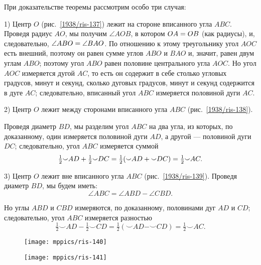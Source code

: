 При доказательстве теоремы рассмотрим особо три случая:

1) Центр $O$ (рис.~\ref{1938/ris-137}) лежит на стороне вписанного угла $ABC$.
Проведя радиус $AO$, мы получим $\angle AOB$, в котором $OA \z= OB$ (как радиусы), и, следовательно, $\angle ABO\z=\angle BAO$.
По отношению к этому треугольнику угол $AOC$ есть внешний, поэтому он равен сумме углов $ABO$ и $BAO$ и, значит, равен двум углам $ABO$;
поэтому угол $ABO$ равен половине центрального угла $AOC$.
Но угол $AOC$ измеряется дугой $AC$, то есть
он содержит в себе столько угловых градусов, минут и секунд, сколько дуговых градусов, минут и секунд содержится в дуге $AC$;
следовательно, вписанный угол $ABC$ измеряется половиной дуги $AC$.

2) Центр $O$ лежит между сторонами вписанного угла $ABC$ (рис.~\ref{1938/ris-138}).

Проведя диаметр $BD$, мы разделим угол $ABC$ на два угла, из которых, по доказанному, один измеряется половиной дуги $AD$, а другой — половиной дуги $DC$;
следовательно, угол $ABC$ измеряется суммой
\[\tfrac12{\smallsmile}AD\z+\tfrac12{\smallsmile}DC=\tfrac12({\smallsmile}AD\z+{\smallsmile}DC)=\tfrac12{\smallsmile}AC.\]


3) Центр $O$ лежит вне вписанного угла $ABC$ (рис.~\ref{1938/ris-139}).
Проведя диаметр $BD$, мы будем иметь:
\[\angle ABC=\angle ABD-\angle CBD.\]

Но углы $ABD$ и $CBD$ измеряются, по доказанному, половинами дуг $AD$ и $CD$;
следовательно, угол $ABC$ измеряется разностью
\[\tfrac12{\smallsmile}AD-\tfrac12{\smallsmile}CD=\tfrac12({\smallsmile}AD-{\smallsmile}CD)=\tfrac12{\smallsmile}AC.\]

\begin{figure}[h]
\begin{minipage}{.48\textwidth}
\centering
\texttt{[image: mppics/ris-140]}
\end{minipage}
\hfill
\begin{minipage}{.48\textwidth}
\centering
\texttt{[image: mppics/ris-141]}
\end{minipage}

\medskip

\begin{minipage}{.48\textwidth}
\centering
\caption{}\label{1938/ris-140}
\end{minipage}
\hfill
\begin{minipage}{.48\textwidth}
\centering
\caption{}\label{1938/ris-141}
\end{minipage}
\vskip-4mm
\end{figure}

